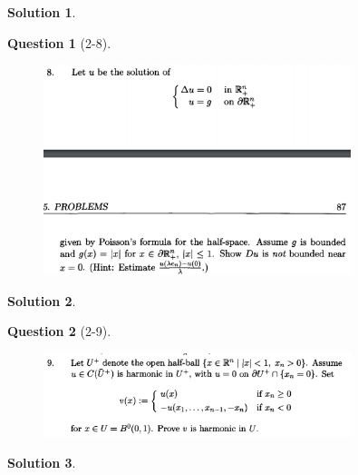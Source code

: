 \documentclass{article} %
\theoremstyle{quest}
\newtheorem*{question}{Question}
\newtheorem*{solution}{Solution}
\begin{document}
\begin{solution}
\end{solution}

\newpage

\begin{question}[2-8]
\hfill
\begin{figure}[h!]
  \centering
    \includegraphics[width=0.8\textwidth]{evans-2-8.png}
\end{figure}
\end{question}

\begin{solution}
\end{solution}
\newpage

\begin{question}[2-9]
\hfill
\begin{figure}[h!]
  \centering
    \includegraphics[width=0.8\textwidth]{evans-2-9.png}
\end{figure}
\end{question}

\begin{solution}
\end{solution}
\end{document}
